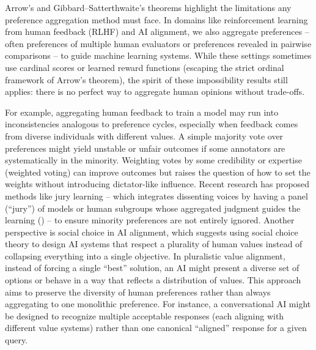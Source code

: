 \documentclass[
  letterpaper,
  numbers=noenddot,
  DIV=11]{scrreprt}
\theoremstyle{plain}
\theoremstyle{definition}
\theoremstyle{remark}
\begin{document}
Arrow's and Gibbard--Satterthwaite's theorems highlight the limitations
any preference aggregation method must face. In domains like
reinforcement learning from human feedback (RLHF) and AI alignment, we
also aggregate preferences -- often preferences of multiple human
evaluators or preferences revealed in pairwise comparisons -- to guide
machine learning systems. While these settings sometimes use cardinal
scores or learned reward functions (escaping the strict ordinal
framework of Arrow's theorem), the spirit of these impossibility results
still applies: there is no perfect way to aggregate human opinions
without trade-offs.

For example, aggregating human feedback to train a model may run into
inconsistencies analogous to preference cycles, especially when feedback
comes from diverse individuals with different values. A simple majority
vote over preferences might yield unstable or unfair outcomes if some
annotators are systematically in the minority. Weighting votes by some
credibility or expertise (weighted voting) can improve outcomes but
raises the question of how to set the weights without introducing
dictator-like influence. Recent research has proposed methods like jury
learning -- which integrates dissenting voices by having a panel
(``jury'') of models or human subgroups whose aggregated judgment guides
the learning () -- to
ensure minority preferences are not entirely ignored. Another
perspective is social choice in AI alignment, which suggests using
social choice theory to design AI systems that respect a plurality of
human values instead of collapsing everything into a single objective.
In pluralistic value alignment, instead of forcing a single ``best''
solution, an AI might present a diverse set of options or behave in a
way that reflects a distribution of values. This approach aims to
preserve the diversity of human preferences rather than always
aggregating to one monolithic preference. For instance, a conversational
AI might be designed to recognize multiple acceptable responses (each
aligning with different value systems) rather than one canonical
``aligned'' response for a given query.
\end{document}
